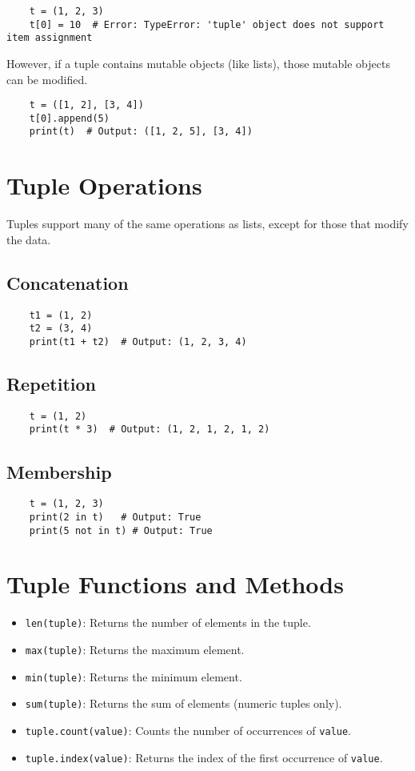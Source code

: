\begin{verbatim}
	t = (1, 2, 3)
	t[0] = 10  # Error: TypeError: 'tuple' object does not support item assignment
\end{verbatim}

However, if a tuple contains mutable objects (like lists), those mutable objects can be modified.

\begin{verbatim}
	t = ([1, 2], [3, 4])
	t[0].append(5)
	print(t)  # Output: ([1, 2, 5], [3, 4])
\end{verbatim}

\section{Tuple Operations}
Tuples support many of the same operations as lists, except for those that modify the data.

\subsection{Concatenation}
\begin{verbatim}
	t1 = (1, 2)
	t2 = (3, 4)
	print(t1 + t2)  # Output: (1, 2, 3, 4)
\end{verbatim}

\subsection{Repetition}
\begin{verbatim}
	t = (1, 2)
	print(t * 3)  # Output: (1, 2, 1, 2, 1, 2)
\end{verbatim}

\subsection{Membership}
\begin{verbatim}
	t = (1, 2, 3)
	print(2 in t)   # Output: True
	print(5 not in t) # Output: True
\end{verbatim}

\section{Tuple Functions and Methods}
\begin{itemize}
	\item \texttt{len(tuple)}: Returns the number of elements in the tuple.
	\item \texttt{max(tuple)}: Returns the maximum element.
	\item \texttt{min(tuple)}: Returns the minimum element.
	\item \texttt{sum(tuple)}: Returns the sum of elements (numeric tuples only).
	\item \texttt{tuple.count(value)}: Counts the number of occurrences of \texttt{value}.
	\item \texttt{tuple.index(value)}: Returns the index of the first occurrence of \texttt{value}.
\end{itemize}

